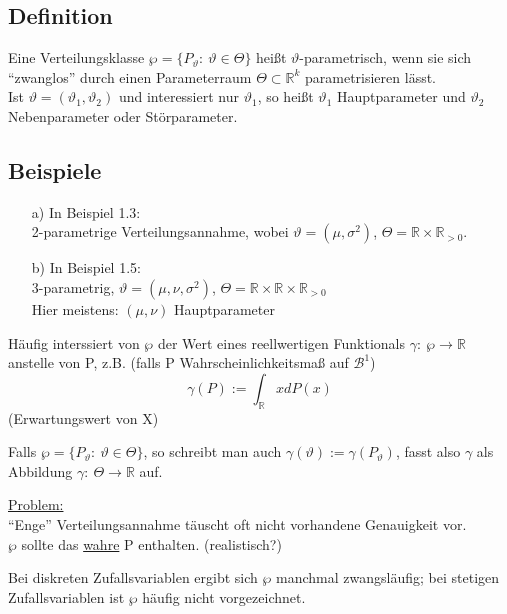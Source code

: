 \documentclass[a4paper,11pt,twoside,titlepage]{article}
\newcommand{\R}{{\mathbb R}}
\newcommand\BB{ \mathcal{B} } %
\begin{document}
\subsection{Definition}
Eine Verteilungsklasse $\wp=\{P_\vartheta:\ \vartheta\in\Theta\}$ heißt $\vartheta$-parametrisch, wenn sie sich "`zwanglos"' durch einen Parameterraum $\Theta\subset\R^k$ parametrisieren lässt.\\
Ist $\vartheta=(\vartheta_1,\vartheta_2)$ und interessiert nur $\vartheta_1$, so heißt $\vartheta_1$ Hauptparameter und $\vartheta_2$ Nebenparameter oder Störparameter.

\subsection{Beispiele}
\begin{itemize}
\item[a) ]In Beispiel 1.3:\\ 2-parametrige Verteilungsannahme, wobei $\vartheta=(\mu,\sigma^2)$, $\Theta=\R\times\R_{>0}$.
\item[b) ]In Beispiel 1.5:\\ 3-parametrig, $\vartheta=(\mu,\nu,\sigma^2)$, $\Theta=\R\times\R\times\R_{>0}$\\
Hier meistens: $(\mu,\nu)$ Hauptparameter
\end{itemize}

Häufig interssiert von $\wp$ der Wert eines reellwertigen Funktionals $\gamma:\ \wp\to\R$ anstelle von P, z.B. (falls P Wahrscheinlichkeitsmaß auf $\BB^1$)
\[\gamma(P):=\int_\R xdP(x)\]
(Erwartungswert von X)

Falls $\wp=\{P_\vartheta:\ \vartheta\in\Theta\}$, so schreibt man auch $\gamma(\vartheta):=\gamma(P_\vartheta)$, fasst also $\gamma$ als Abbildung $\gamma:\ \Theta\to\R$ auf.

\underline{Problem:}\\
"`Enge"' Verteilungsannahme täuscht oft nicht vorhandene Genauigkeit vor.\\
$\wp$ sollte das \underline{wahre} P enthalten. (realistisch?)

Bei diskreten Zufallsvariablen ergibt sich $\wp$ manchmal zwangsläufig; bei stetigen Zufallsvariablen ist $\wp$ häufig nicht vorgezeichnet.
\end{document}
